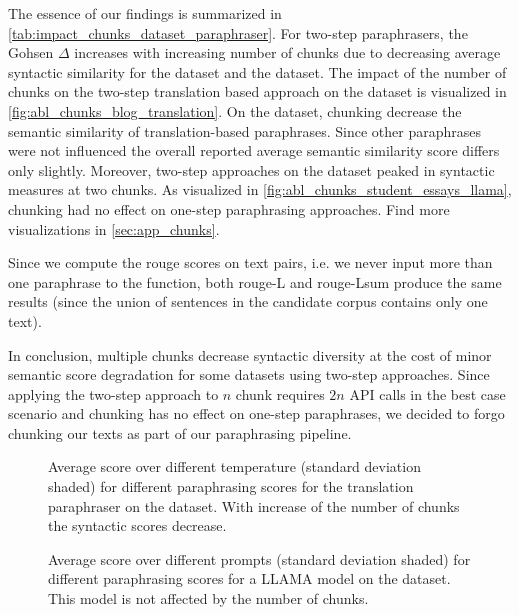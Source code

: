 The essence of our findings is summarized in \autoref{tab:impact_chunks_dataset_paraphraser}.
For two-step paraphrasers, the Gohsen $\Delta$ increases with increasing number of chunks due to decreasing average syntactic similarity for the \dataBlog{} dataset and the \dataStudent{} dataset.
The impact of the number of chunks on the two-step translation based approach on the \dataBlog{} dataset is visualized in \autoref{fig:abl_chunks_blog_translation}.
On the \dataGutenberg{} dataset, chunking decrease the semantic similarity of translation-based paraphrases. 
Since other paraphrases were not influenced the overall reported average semantic similarity score differs only slightly.
Moreover, two-step approaches on the \dataPan{} dataset peaked in syntactic measures at two chunks.
As visualized in \autoref{fig:abl_chunks_student_essays_llama}, chunking had no effect on one-step paraphrasing approaches.
Find more visualizations in \autoref{sec:app_chunks}.

Since we compute the \ac{rouge} scores on text pairs, i.e. we never input more than one paraphrase to the function, both \ac{rouge}-L and \ac{rouge}-Lsum produce the same results (since the union of sentences in the candidate corpus contains only one text).

In conclusion, multiple chunks decrease syntactic diversity at the cost of minor semantic score degradation for some datasets using two-step approaches.
Since applying the two-step approach to $n$ chunk requires $2n$ API calls in the best case scenario and chunking has no effect on one-step paraphrases, we decided to forgo chunking our texts as part of our paraphrasing pipeline.

 
\begin{figure}[htbp]
    \centering
    
    \caption{Average score over different temperature (standard deviation shaded) for different paraphrasing scores for the translation paraphraser on the \dataBlog{} dataset.
    With increase of the number of chunks the syntactic scores decrease.}
    \label{fig:abl_chunks_blog_translation}
\end{figure}



\begin{figure}[htbp]
    \centering
    
    \caption{Average score over different prompts (standard deviation shaded) for different paraphrasing scores for a LLAMA model on the \dataStudent{} dataset. 
    This model is not affected by the number of chunks.}
    \label{fig:abl_chunks_student_essays_llama}
\end{figure}